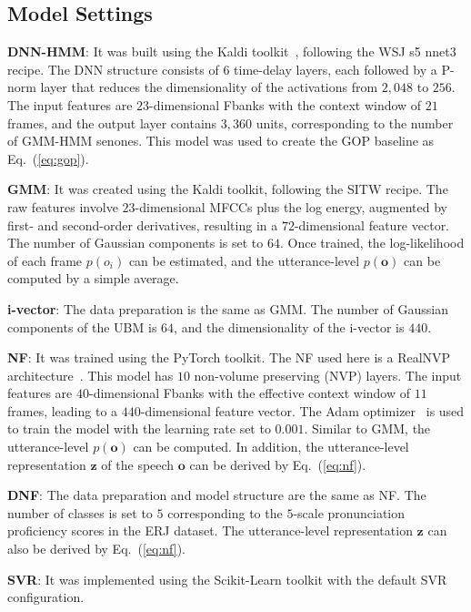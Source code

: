 \documentclass[a4paper]{article}
\begin{document}
\subsection{Model Settings}

\noindent \textbf{DNN-HMM}: It was built using the Kaldi toolkit~\cite{povey2011kaldi}, following the WSJ s5 nnet3 recipe.
The DNN structure consists of $6$ time-delay layers, each followed by a P-norm layer that reduces the dimensionality of the activations
from $2,048$ to $256$. The input features are $23$-dimensional Fbanks with the context window of $21$ frames,
and the output layer contains $3,360$ units, corresponding to the number of GMM-HMM senones.
This model was used to create the GOP baseline as Eq.~(\ref{eq:gop}).

\noindent \textbf{GMM}: It was created using the Kaldi toolkit, following the SITW recipe.
The raw features involve $23$-dimensional MFCCs plus the log energy, augmented by first- and second-order derivatives,
resulting in a $72$-dimensional feature vector. The number of Gaussian components is set to $64$.
Once trained, the log-likelihood of each frame $p(o_i)$ can be estimated,
and the utterance-level $p(\mathbf{o})$ can be computed by a simple average.

\noindent \textbf{i-vector}: The data preparation is the same as GMM.
The number of Gaussian components of the UBM is $64$, and the dimensionality of the i-vector is $440$.

\noindent \textbf{NF}: It was trained using the PyTorch toolkit. The NF used here is a RealNVP architecture~\cite{dinh2016density}.
This model has $10$ non-volume preserving (NVP) layers.
The input features are $40$-dimensional Fbanks with the effective context window of $11$ frames,
leading to a $440$-dimensional feature vector.
The Adam optimizer~\cite{kingma2014adam} is used to train the model with the learning rate set to $0.001$.
Similar to GMM, the utterance-level $p(\mathbf{o})$ can be computed.
In addition, the utterance-level representation $\mathbf{z}$ of the speech $\mathbf{o}$ can be derived by Eq.~(\ref{eq:nf}).

\noindent \textbf{DNF}: The data preparation and model structure are the same as NF.
The number of classes is set to $5$ corresponding to the $5$-scale pronunciation proficiency scores in the ERJ dataset.
The utterance-level representation $\mathbf{z}$ can also be derived by Eq.~(\ref{eq:nf}).

\noindent \textbf{SVR}: It was implemented using the Scikit-Learn toolkit with the default SVR configuration.
\end{document}
